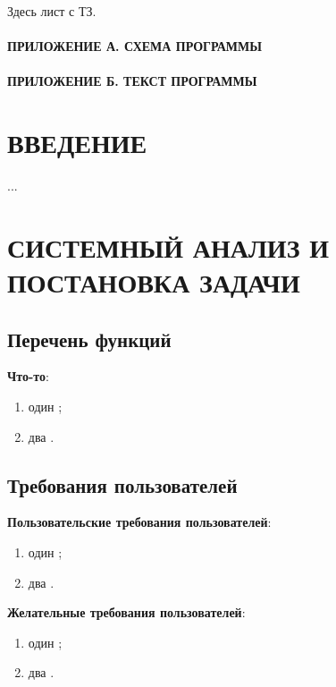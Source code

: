 \documentclass[
  12pt, %
  a4paper, %
  simple, %
  floatsection %
]{eskdtext}
\begin{document}



Здесь лист с ТЗ.


\newpage
{}
\tableofcontents
\thispagestyle{empty} %
\paragraph{ПРИЛОЖЕНИЕ А. СХЕМА ПРОГРАММЫ}
\paragraph{ПРИЛОЖЕНИЕ Б. ТЕКСТ ПРОГРАММЫ}


\newpage
{}
\section*{ВВЕДЕНИЕ}

...

\newpage
\section{СИСТЕМНЫЙ АНАЛИЗ И ПОСТАНОВКА ЗАДАЧИ}

\subsection{Перечень функций}

\textbf {Что-то}:
\begin{enumerate}
    \item один ;
    \item два .
\end{enumerate}

\subsection{Требования пользователей}

\textbf{Пользовательские требования пользователей}:
\begin{enumerate}
    \item один ;
    \item два .
\end{enumerate}

\textbf{Желательные требования пользователей}:
\begin{enumerate}
    \item один ;
    \item два .
\end{enumerate}
\end{document}
